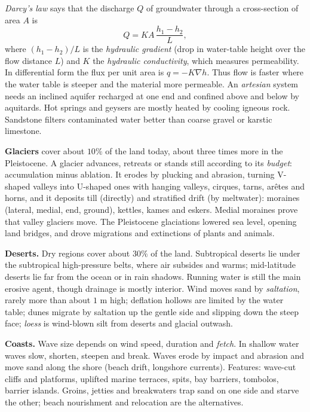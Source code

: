 \emph{Darcy's law} says that the discharge
$Q$ of groundwater through a cross-section
of area $A$ is
\begin{equation}
\label{equation-darcy}
Q = K A \,\frac{h_1-h_2}{L},
\end{equation}
where $(h_1-h_2)/L$ is the
\emph{hydraulic gradient} (drop in
water-table height over the flow distance
$L$) and $K$ the \emph{hydraulic
conductivity}, which measures
permeability. In differential form the
flux per unit area is $q = -K\nabla h$.
Thus flow is faster where the water table
is steeper and the material more
permeable. An \emph{artesian} system needs
an inclined aquifer recharged at one end
and confined above and below by
aquitards. Hot springs and geysers are
mostly heated by cooling igneous rock.
Sandstone filters contaminated water better
than coarse gravel or karstic limestone.

\textbf{Glaciers} cover about $10\%$ of the
land today, about three times more in the
Pleistocene. A glacier advances, retreats
or stands still according to its
\emph{budget}: accumulation minus ablation.
It erodes by plucking and abrasion, turning
V-shaped valleys into U-shaped ones with
hanging valleys, cirques, tarns, ar\^etes
and horns, and it deposits till (directly)
and stratified drift (by meltwater):
moraines (lateral, medial, end, ground),
kettles, kames and eskers. Medial moraines
prove that valley glaciers move. The
Pleistocene glaciations lowered sea level,
opening land bridges, and drove migrations
and extinctions of plants and animals.

\textbf{Deserts.} Dry regions cover about
$30\%$ of the land. Subtropical deserts lie
under the subtropical high-pressure belts,
where air subsides and warms; mid-latitude
deserts lie far from the ocean or in rain
shadows. Running water is still the main
erosive agent, though drainage is mostly
interior. Wind moves sand by
\emph{saltation}, rarely more than about
$1$ m high; deflation hollows are limited
by the water table; dunes migrate by
saltation up the gentle side and slipping
down the steep face; \emph{loess} is
wind-blown silt from deserts and glacial
outwash.

\textbf{Coasts.} Wave size depends on wind
speed, duration and \emph{fetch}. In
shallow water waves slow, shorten, steepen
and break. Waves erode by impact and
abrasion and move sand along the shore
(beach drift, longshore currents). Features:
wave-cut cliffs and platforms, uplifted
marine terraces, spits, bay barriers,
tombolos, barrier islands. Groins, jetties
and breakwaters trap sand on one side and
starve the other; beach nourishment and
relocation are the alternatives.

